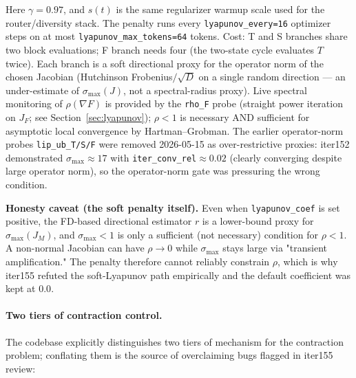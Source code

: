 \documentclass[11pt]{article}
\begin{document}
Here $\gamma=0.97$, and $s(t)$ is the same regularizer warmup scale used for
the router/diversity stack.  The penalty runs every
\texttt{lyapunov\_every=16} optimizer steps on at most
\texttt{lyapunov\_max\_tokens=64} tokens.  Cost: T and S branches share
two block evaluations; F branch needs four (the two-state cycle evaluates
$T$ twice).  Each branch is a soft directional proxy for the operator
norm of the chosen Jacobian (Hutchinson Frobenius$/\sqrt D$ on a single
random direction — an under-estimate of $\sigma_{\max}(J)$, not a
spectral-radius proxy).  Live spectral monitoring of $\rho(\nabla F)$ is
provided by the \texttt{rho\_F} probe (straight power iteration on $J_F$;
see Section~\ref{sec:lyapunov}); $\rho<1$ is necessary AND sufficient for
asymptotic local convergence by Hartman--Grobman.  The earlier
operator-norm probes \texttt{lip\_ub\_T/S/F} were removed 2026-05-15 as
over-restrictive proxies: iter152 demonstrated $\sigma_{\max}\approx 17$
with \texttt{iter\_conv\_rel}$\approx 0.02$ (clearly converging despite
large operator norm), so the operator-norm gate was pressuring the wrong
condition.

\textbf{Honesty caveat (the soft penalty itself).}  Even when
\texttt{lyapunov\_coef} is set positive, the FD-based directional
estimator $r$ is a lower-bound proxy for $\sigma_{\max}(J_M)$, and
$\sigma_{\max}<1$ is only a sufficient (not necessary) condition for
$\rho<1$.  A non-normal Jacobian can have $\rho\to 0$ while
$\sigma_{\max}$ stays large via "transient amplification."  The penalty
therefore cannot reliably constrain $\rho$, which is why iter155 refuted
the soft-Lyapunov path empirically and the default coefficient was kept
at $0.0$.

\paragraph{Two tiers of contraction control.}
The codebase explicitly distinguishes two tiers of mechanism for the
contraction problem; conflating them is the source of overclaiming bugs
flagged in iter155 review:
\end{document}
